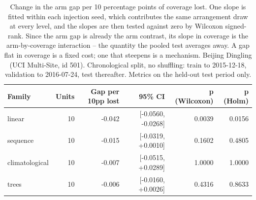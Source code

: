 \begin{table}[htbp]
\caption{Change in the arm gap per 10 percentage points of coverage lost. One slope is fitted within each injection seed, which contributes the same arrangement draw at every level, and the slopes are then tested against zero by Wilcoxon signed-rank. Since the arm gap is already the arm contrast, its slope in coverage is the arm-by-coverage interaction -- the quantity the pooled test averages away. A gap flat in coverage is a fixed cost; one that steepens is a mechanism. Beijing Dingling (UCI Multi-Site, id 501). Chronological split, no shuffling: train to 2015-12-18, validation to 2016-07-24, test thereafter. Metrics on the held-out test period only.}
\label{tab:ablation_dose_response}
\begin{tabular}{lrrrrr}
\toprule
Family & Units & Gap per 10pp lost & 95\% CI & p (Wilcoxon) & p (Holm) \\
\midrule
linear & 10 & -0.042 & [-0.0560, -0.0268] & 0.0039 & 0.0156 \\
sequence & 10 & -0.015 & [-0.0319, +0.0010] & 0.1602 & 0.4805 \\
climatological & 10 & -0.007 & [-0.0515, +0.0289] & 1.0000 & 1.0000 \\
trees & 10 & -0.006 & [-0.0160, +0.0026] & 0.4316 & 0.8633 \\
\bottomrule
\end{tabular}
\end{table}
